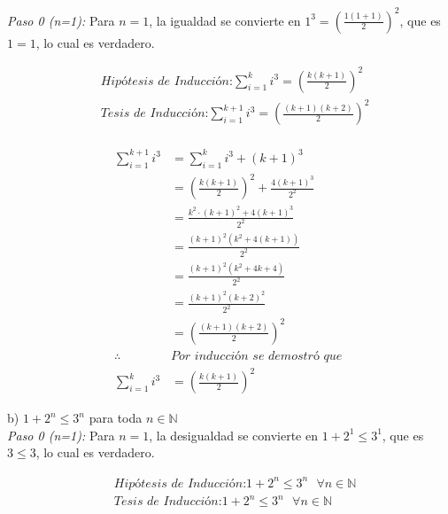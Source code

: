 \documentclass{article}
\begin{document}
\textit{Paso 0 (n=1):}
Para \(n = 1\), la igualdad se convierte en \(1^3=\left(\frac{1(1+1)}{2}\right)^2\), que es \(1 = 1\), lo cual es verdadero.

  
\begin{align*}
&\textit{Hipótesis de Inducción:} \sum_{i = 1}^{k} i^3 = \left(\frac{k(k+1)}{2}\right)^2 \\
&\textit{Tesis de Inducción:} \sum_{i = 1}^{k+1} i^3 = \left(\frac{(k+1)(k+2)}{2}\right)^2 \\
\end{align*}

\begin{align*}
\sum_{i = 1}^{k+1} i^3 &= \sum_{i = 1}^{k} i^3 + (k+1)^3 \\
&= \left(\frac{k(k+1)}{2}\right)^2 + \frac{4(k+1)^3}{2^2} \\
&= \frac{k^2 \cdot (k+1)^2 + 4(k+1)^3}{2^2} \\
&= \frac{(k+1)^2(k^2+4(k+1))}{2^2} \\
&= \frac{(k+1)^2(k^2 + 4k + 4)}{2^2} \\
&= \frac{(k+1)^2(k + 2)^2}{2^2} \\
&= \left(\frac{(k+1)(k+2)}{2}\right)^2 \\
\therefore &\textit{Por inducción se demostró que } \\
\sum_{i = 1}^{k} i^3 &= \left(\frac{k(k+1)}{2}\right)^2
\end{align*}

  
  b) \(1+2^n\leq 3^n\) para toda \(n\in\mathbb{N}\) \\

\textit{Paso 0 (n=1):}
Para \(n = 1\), la desigualdad se convierte en \(1+2^1 \leq 3^1\), que es \(3 \leq 3\), lo cual es verdadero.
  
\begin{align*}
&\textit{Hipótesis de Inducción:} 1+2^n \leq 3^n \textit{   }\forall n \in \mathbb{N} \\
&\textit{Tesis de Inducción:} 1+2^n \leq 3^n \textit{   }\forall n \in \mathbb{N}
\end{align*}
\end{document}
